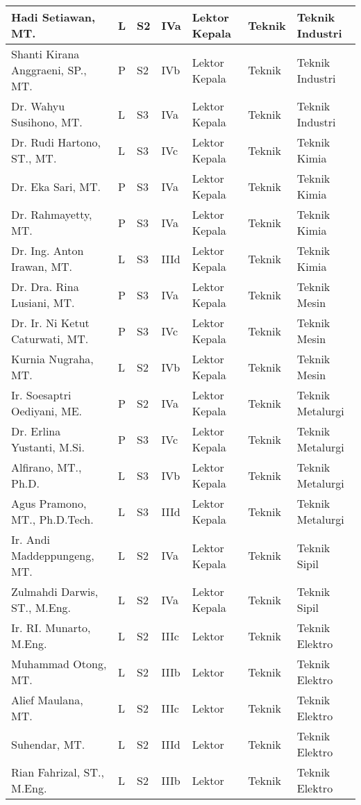 \documentclass[
]{book}
\begin{document}
\begin{longtable}{l|l|l|l|l|l|l}
\hline
Hadi Setiawan, MT. & L & S2 & IVa & Lektor Kepala & Teknik & Teknik Industri\\
\hline
Shanti Kirana Anggraeni, SP., MT. & P & S2 & IVb & Lektor Kepala & Teknik & Teknik Industri\\
\hline
Dr. Wahyu Susihono, MT. & L & S3 & IVa & Lektor Kepala & Teknik & Teknik Industri\\
\hline
Dr. Rudi Hartono, ST., MT. & L & S3 & IVc & Lektor Kepala & Teknik & Teknik Kimia\\
\hline
Dr. Eka Sari, MT. & P & S3 & IVa & Lektor Kepala & Teknik & Teknik Kimia\\
\hline
Dr. Rahmayetty, MT. & P & S3 & IVa & Lektor Kepala & Teknik & Teknik Kimia\\
\hline
Dr. Ing.  Anton Irawan, MT. & L & S3 & IIId & Lektor Kepala & Teknik & Teknik Kimia\\
\hline
Dr. Dra. Rina Lusiani, MT. & P & S3 & IVa & Lektor Kepala & Teknik & Teknik Mesin\\
\hline
Dr. Ir. Ni Ketut Caturwati, MT. & P & S3 & IVc & Lektor Kepala & Teknik & Teknik Mesin\\
\hline
Kurnia Nugraha, MT. & L & S2 & IVb & Lektor Kepala & Teknik & Teknik Mesin\\
\hline
Ir. Soesaptri Oediyani, ME. & P & S2 & IVa & Lektor Kepala & Teknik & Teknik Metalurgi\\
\hline
Dr. Erlina Yustanti, M.Si. & P & S3 & IVc & Lektor Kepala & Teknik & Teknik Metalurgi\\
\hline
Alfirano, MT., Ph.D. & L & S3 & IVb & Lektor Kepala & Teknik & Teknik Metalurgi\\
\hline
Agus Pramono, MT., Ph.D.Tech. & L & S3 & IIId & Lektor Kepala & Teknik & Teknik Metalurgi\\
\hline
Ir. Andi Maddeppungeng, MT. & L & S2 & IVa & Lektor Kepala & Teknik & Teknik Sipil\\
\hline
Zulmahdi Darwis, ST., M.Eng. & L & S2 & IVa & Lektor Kepala & Teknik & Teknik Sipil\\
\hline
Ir. RI. Munarto, M.Eng. & L & S2 & IIIc & Lektor & Teknik & Teknik Elektro\\
\hline
Muhammad Otong, MT. & L & S2 & IIIb & Lektor & Teknik & Teknik Elektro\\
\hline
Alief Maulana, MT. & L & S2 & IIIc & Lektor & Teknik & Teknik Elektro\\
\hline
Suhendar, MT. & L & S2 & IIId & Lektor & Teknik & Teknik Elektro\\
\hline
Rian Fahrizal, ST., M.Eng. & L & S2 & IIIb & Lektor & Teknik & Teknik Elektro\\

\end{longtable}
\end{document}
